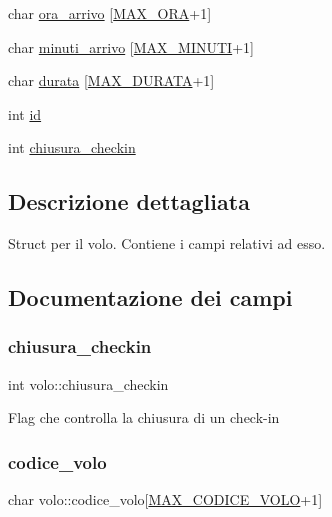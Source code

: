\begin{DoxyCompactItemize}
\item 
char \hyperlink{structvolo_abf76dd17ffe6c732d6a00196a66caefb}{ora\+\_\+arrivo} \mbox{[}\hyperlink{define_8h_a0e20e0c8264b18234ee1c3f1eb4943f0}{M\+A\+X\+\_\+\+O\+RA}+1\mbox{]}
\item 
char \hyperlink{structvolo_ab85573e3b6903e72e14034bb17b05420}{minuti\+\_\+arrivo} \mbox{[}\hyperlink{define_8h_ac5b85a4e0fdb0ecb53800fca4922a22a}{M\+A\+X\+\_\+\+M\+I\+N\+U\+TI}+1\mbox{]}
\item 
char \hyperlink{structvolo_a0d869a43e985f858edac3dfc796484b9}{durata} \mbox{[}\hyperlink{define_8h_afdc1d62558736f5b72c015ed10b9e216}{M\+A\+X\+\_\+\+D\+U\+R\+A\+TA}+1\mbox{]}
\item 
int \hyperlink{structvolo_a57c5aa808be475f1d9d5ab0b9790197b}{id}
\item 
int \hyperlink{structvolo_a5dc5edb524bec6a878c9e2e8da423b07}{chiusura\+\_\+checkin}
\end{DoxyCompactItemize}


\subsection{Descrizione dettagliata}
Struct per il volo. Contiene i campi relativi ad esso. 

\subsection{Documentazione dei campi}
\mbox{\label{structvolo_a5dc5edb524bec6a878c9e2e8da423b07}} 
\subsubsection{\texorpdfstring{chiusura\+\_\+checkin}{chiusura\_checkin}}
{\footnotesize\ttfamily int volo\+::chiusura\+\_\+checkin}

Flag che controlla la chiusura di un check-\/in \mbox{\label{structvolo_a6c8757974fc1712c96a1361a1787ac3c}} 
\subsubsection{\texorpdfstring{codice\+\_\+volo}{codice\_volo}}
{\footnotesize\ttfamily char volo\+::codice\+\_\+volo\mbox{[}\hyperlink{define_8h_a1811e377eb1cf22df1197a2cfa949e73}{M\+A\+X\+\_\+\+C\+O\+D\+I\+C\+E\+\_\+\+V\+O\+LO}+1\mbox{]}}

